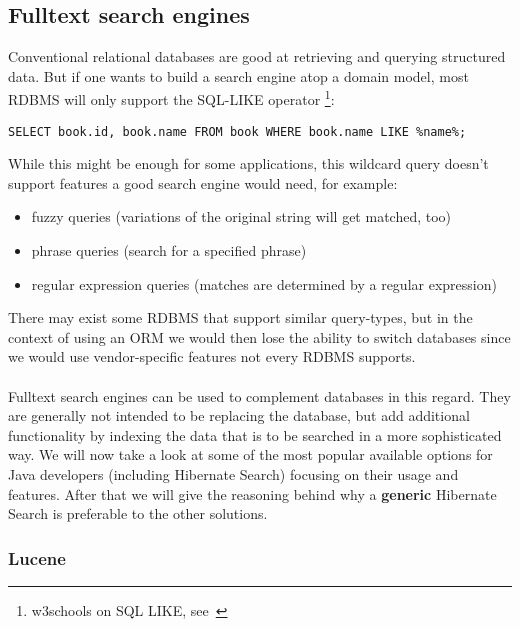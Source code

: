 \subsection{Fulltext search engines}

Conventional relational databases are good at retrieving and querying structured data. But if one wants to build a search engine atop a domain model, most RDBMS will only support the SQL-LIKE operator \footnote{w3schools on SQL LIKE, see~\cite{sql_like_w3schools}}:\\

\lstset{language=sql}
\begin{lstlisting}[frame=htrbl, caption={SQL LIKE operator in use}, label={lst:result2}]
SELECT book.id, book.name FROM book WHERE book.name LIKE %name%;
\end{lstlisting}
While this might be enough for some applications, this wildcard query doesn't support features a good search engine would need, for example:

\begin{itemize}
	\item fuzzy queries (variations of the original string will get matched, too)
	\item phrase queries (search for a specified phrase)
	\item regular expression queries (matches are determined by a regular expression)
\end{itemize}
There may exist some RDBMS that support similar query-types, but in the context of using an ORM we would then lose the ability to switch databases since we would use vendor-specific features not every RDBMS supports.
\\\\
Fulltext search engines can be used to complement databases in this regard. They are generally not intended to be replacing the database, but add additional functionality by indexing the data that is to be searched in a more sophisticated way. We will now take a look at some of the most popular available options for Java developers (including Hibernate Search) focusing on their usage and features. After that we will give the reasoning behind why a \textbf{generic} Hibernate Search is preferable to the other solutions.

\pagebreak

\subsubsection{Lucene}


